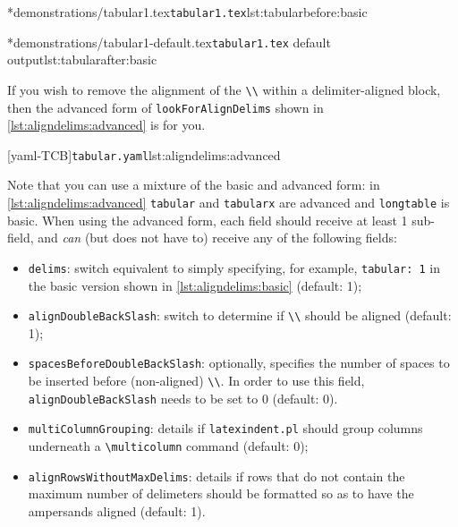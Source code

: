 	\begin{minipage}{.45\textwidth}
		\cmhlistingsfromfile[showspaces=false,showtabs=false]*{demonstrations/tabular1.tex}{\texttt{tabular1.tex}}{lst:tabularbefore:basic}
	\end{minipage}%
	\hfill
	\begin{minipage}{.45\textwidth}
		\cmhlistingsfromfile[showspaces=false,showtabs=false]*{demonstrations/tabular1-default.tex}{\texttt{tabular1.tex} default output}{lst:tabularafter:basic}
	\end{minipage}%

	If you wish to remove the alignment of the \lstinline!\\! within a delimiter-aligned block, then the
	advanced form of \texttt{lookForAlignDelims} shown in \cref{lst:aligndelims:advanced} is for you.

	[yaml-TCB]{\texttt{tabular.yaml}}{lst:aligndelims:advanced}

	Note that you can use a mixture of the basic and advanced form: in \cref{lst:aligndelims:advanced} \texttt{tabular} and \texttt{tabularx}
	are advanced and \texttt{longtable} is basic. When using the advanced form, each field should receive at least 1 sub-field, and \emph{can}
	(but does not have to) receive any of the following fields:
	\begin{itemize}
		\item \texttt{delims}: switch equivalent to simply specifying, for example, \texttt{tabular: 1} in
		      the basic version shown in \cref{lst:aligndelims:basic} (default: 1);
		\item \texttt{alignDoubleBackSlash}: switch to determine if \lstinline!\\! should be aligned (default: 1);
		\item \texttt{spacesBeforeDoubleBackSlash}: optionally, specifies the number of spaces to be inserted
		      before (non-aligned) \lstinline!\\!. In order to use this field, \texttt{alignDoubleBackSlash} needs
		      to be set to 0 (default: 0).
		\item {} \texttt{multiColumnGrouping}: details if \texttt{latexindent.pl} should group columns
		      underneath a \lstinline!\multicolumn! command (default: 0);
		\item {} \texttt{alignRowsWithoutMaxDelims}: details if rows that do not contain the
		      maximum number of delimeters should be formatted so as to have the ampersands aligned (default: 1).
	\end{itemize}

